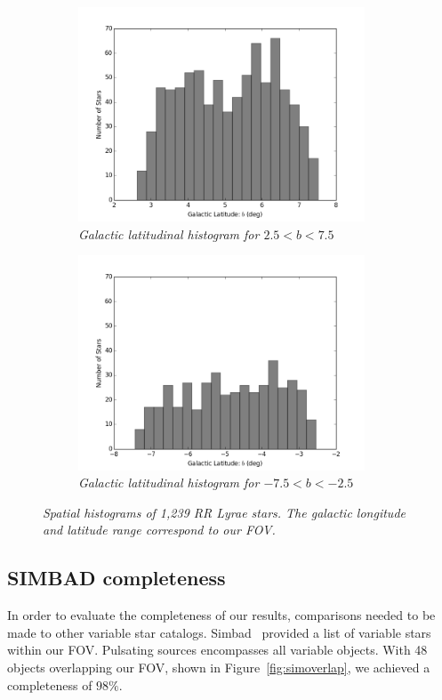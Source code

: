 \documentclass[aps,prb,twocolumn,superscriptaddress]{revtex4-1}
\begin{document}
\begin{figure}
	\begin{subfigure}{.5\textwidth}
	  \centering
	  \includegraphics[width=3.35in]{figures/PlotsSpace15/bphist_limit15.png}
		\caption{\it \small{Galactic latitudinal histogram for $2.5 < b < 7.5$}}
		\label{fig:bphist}
	\end{subfigure}%
	\begin{subfigure}{.5\textwidth}
	  \centering
			\includegraphics[width=3.35in]{figures/PlotsSpace15/bnhist_limit15.png}
		\caption{\it \small{Galactic latitudinal histogram for $-7.5 < b < -2.5$}}
		\label{fig:bnhist}
	\end{subfigure}%
	\caption{\it \small{Spatial histograms of 1,239 RR Lyrae stars. The galactic longitude and latitude range correspond to our FOV.}}
	\label{fig:blhist}
\end{figure}


 


\subsection{SIMBAD completeness}

In order to evaluate the completeness of our results, comparisons needed to be made to other variable star catalogs.  Simbad~\cite{simbad} provided a list of variable stars within our FOV.  Pulsating sources encompasses all variable objects.  With 48 objects overlapping our FOV, shown in Figure~\ref{fig:simoverlap}, we achieved a completeness of $98\%$.
\end{document}
